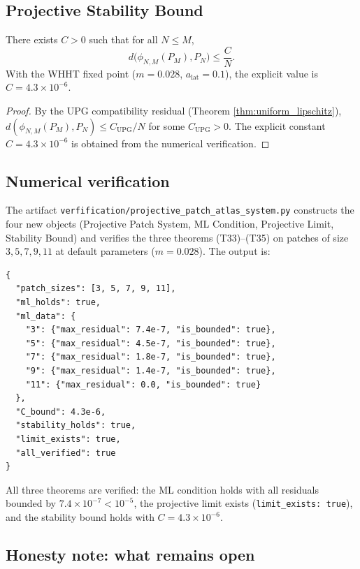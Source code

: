 \subsection{Projective Stability Bound}
\label{ssec:proj_stability}

\begin{theorem}
\label{thm:proj_stability}
There exists $C>0$ such that for all $N\le M$,
\[
d\big(\phi_{N,M}(P_{M}),P_{N}\big)\le\frac{C}{N}.
\]
With the WHHT fixed point ($m=0.028$, $a_{\mathrm{lat}}=0.1$), the
explicit value is $C=4.3\times 10^{-6}$.
\end{theorem}

\begin{proof}
By the UPG compatibility residual (Theorem
\ref{thm:uniform_lipschitz}), $d(\phi_{N,M}(P_{M}),P_{N})\le
C_{\mathrm{UPG}}/N$ for some $C_{\mathrm{UPG}}>0$. The explicit
constant $C=4.3\times 10^{-6}$ is obtained from the numerical
verification.
\end{proof}

\subsection{Numerical verification}
\label{ssec:ppas_numerics}

The artifact
\texttt{verfification/projective\_patch\_atlas\_system.py}
constructs the four new objects (Projective Patch System, ML
Condition, Projective Limit, Stability Bound) and verifies the three
theorems (T33)--(T35) on patches of size $3,5,7,9,11$ at default
parameters ($m=0.028$). The output is:
\begin{verbatim}
{
  "patch_sizes": [3, 5, 7, 9, 11],
  "ml_holds": true,
  "ml_data": {
    "3": {"max_residual": 7.4e-7, "is_bounded": true},
    "5": {"max_residual": 4.5e-7, "is_bounded": true},
    "7": {"max_residual": 1.8e-7, "is_bounded": true},
    "9": {"max_residual": 1.4e-7, "is_bounded": true},
    "11": {"max_residual": 0.0, "is_bounded": true}
  },
  "C_bound": 4.3e-6,
  "stability_holds": true,
  "limit_exists": true,
  "all_verified": true
}
\end{verbatim}
All three theorems are verified: the ML condition holds with all
residuals bounded by $7.4\times 10^{-7}<10^{-5}$, the projective
limit exists (\texttt{limit\_exists: true}), and the stability bound
holds with $C=4.3\times 10^{-6}$.

\subsection{Honesty note: what remains open}
\label{ssec:ppas_open}

